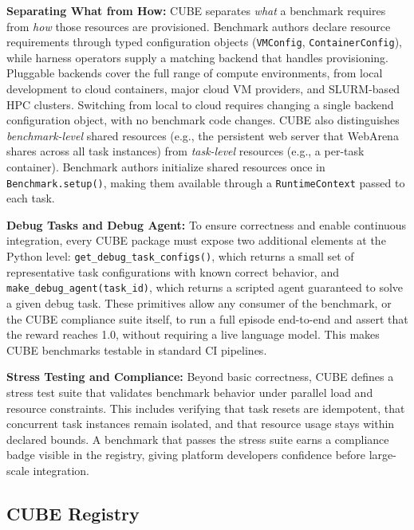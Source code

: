 \documentclass{article}
\theoremstyle{plain}
\theoremstyle{definition}
\theoremstyle{remark}
\begin{document}
\textbf{Separating What from How:} CUBE separates \emph{what} a benchmark requires from \emph{how} those resources are provisioned. Benchmark authors declare resource requirements through typed configuration objects (\texttt{VMConfig}, \texttt{ContainerConfig}), while harness operators supply a matching backend that handles provisioning. Pluggable backends cover the full range of compute environments, from local development to cloud containers, major cloud VM providers, and SLURM-based HPC clusters. Switching from local to cloud requires changing a single backend configuration object, with no benchmark code changes. CUBE also distinguishes \emph{benchmark-level} shared resources (e.g., the persistent web server that WebArena shares across all task instances) from \emph{task-level} resources (e.g., a per-task container). Benchmark authors initialize shared resources once in \texttt{Benchmark.setup()}, making them available through a \texttt{RuntimeContext} passed to each task.

\par\medskip\noindent\textbf{Debug Tasks and Debug Agent:} To ensure correctness and enable continuous integration, every CUBE package must expose two additional elements at the Python level:
\texttt{get\_debug\_task\_configs()}, which returns a small set of representative task configurations with known correct behavior, and \texttt{make\_debug\_agent(task\_id)}, which returns a scripted agent guaranteed to solve a given debug task. These primitives allow any consumer of the benchmark, or the CUBE compliance suite itself, to run a full episode end-to-end and assert that the reward reaches 1.0, without requiring a live language model. This makes CUBE benchmarks testable in standard CI pipelines.\par\medskip\noindent\textbf{Stress Testing and Compliance:} Beyond basic correctness, CUBE defines a stress test suite that validates benchmark behavior under parallel load and resource constraints. This includes verifying that task resets are idempotent, that concurrent task instances remain isolated, and that resource usage stays within declared bounds. A benchmark that passes the stress suite earns a compliance badge visible in the registry, giving platform developers confidence before large-scale integration.





\subsection{CUBE Registry}
\label{sec:registry}
\end{document}
